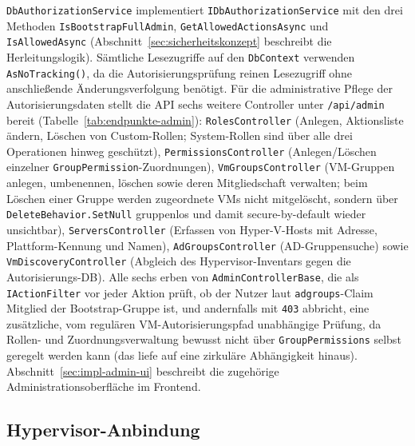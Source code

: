 \documentclass[12pt,a4paper]{article}
\begin{document}
\texttt{DbAuthorizationService} implementiert \texttt{IDbAuthorizationService} mit den drei Methoden \texttt{IsBootstrapFullAdmin}, \texttt{GetAllowedActionsAsync} und \texttt{IsAllowedAsync} (Abschnitt~\ref{sec:sicherheitskonzept} beschreibt die Herleitungslogik). Sämtliche Lesezugriffe auf den \texttt{DbContext} verwenden \texttt{AsNoTracking()}, da die Autorisierungsprüfung reinen Lesezugriff ohne anschließende Änderungsverfolgung benötigt. Für die administrative Pflege der Autorisierungsdaten stellt die API sechs weitere Controller unter \texttt{/api/admin} bereit (Tabelle~\ref{tab:endpunkte-admin}): \texttt{RolesController} (Anlegen, Aktionsliste ändern, Löschen von Custom-Rollen; System-Rollen sind über alle drei Operationen hinweg geschützt), \texttt{PermissionsController} (Anlegen/Löschen einzelner \texttt{GroupPermission}-Zuordnungen), \texttt{VmGroupsController} (VM-Gruppen anlegen, umbenennen, löschen sowie deren Mitgliedschaft verwalten; beim Löschen einer Gruppe werden zugeordnete VMs nicht mitgelöscht, sondern über \texttt{DeleteBehavior.SetNull} gruppenlos und damit secure-by-default wieder unsichtbar), \texttt{ServersController} (Erfassen von Hyper-V-Hosts mit Adresse, Plattform-Kennung und Namen), \texttt{AdGroupsController} (AD-Gruppensuche) sowie \texttt{VmDiscoveryController} (Abgleich des Hypervisor-Inventars gegen die Autorisierungs-DB). Alle sechs erben von \texttt{AdminControllerBase}, die als \texttt{IActionFilter} vor jeder Aktion prüft, ob der Nutzer laut \texttt{adgroups}-Claim Mitglied der Bootstrap-Gruppe ist, und andernfalls mit \texttt{403} abbricht, eine zusätzliche, vom regulären VM-Autorisierungspfad unabhängige Prüfung, da Rollen- und Zuordnungsverwaltung bewusst nicht über \texttt{GroupPermissions} selbst geregelt werden kann (das liefe auf eine zirkuläre Abhängigkeit hinaus). Abschnitt~\ref{sec:impl-admin-ui} beschreibt die zugehörige Administrationsoberfläche im Frontend.

\subsection{Hypervisor-Anbindung}
\label{sec:impl-hyperv}
\end{document}
